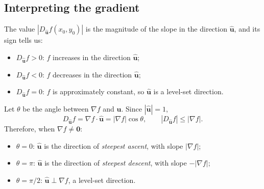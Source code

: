 \subsection{Interpreting the gradient}
The value $|D_{\hat{\mathbf u}}f(x_0,y_0)|$ is the magnitude of the slope in
the direction $\hat{\mathbf u}$, and its sign tells us:
\begin{itemize}
 \item $D_{\hat{\mathbf u}}f>0$: $f$ increases in the direction $\hat{\mathbf u}$;
 \item $D_{\hat{\mathbf u}}f<0$: $f$ decreases in the direction $\hat{\mathbf u}$;
 \item $D_{\hat{\mathbf u}}f=0$: $f$ is approximately constant, so
       $\hat{\mathbf u}$ is a level-set direction.
\end{itemize}
Let $\theta$ be the angle between $\nabla f$ and $\hat{\mathbf u}$. Since
$|\hat{\mathbf u}|=1$,
\[
 D_{\hat{\mathbf u}}f=\nabla f\cdot\hat{\mathbf u}=|\nabla f|\cos\theta,
 \qquad |D_{\hat{\mathbf u}}f|\le|\nabla f|.
\]
Therefore, when $\nabla f\ne\mathbf 0$:
\begin{itemize}
 \item $\theta=0$: $\hat{\mathbf u}$ is the direction of \emph{steepest ascent},
       with slope $|\nabla f|$;
 \item $\theta=\pi$: $\hat{\mathbf u}$ is the direction of \emph{steepest descent},
       with slope $-|\nabla f|$;
 \item $\theta=\pi/2$: $\hat{\mathbf u}\perp\nabla f$, a level-set direction.
\end{itemize}

\begin{center}
\end{center}

\begin{center}
\end{center}
